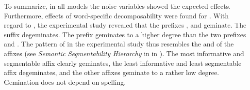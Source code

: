 To summarize, in all models the noise variables showed the expected effects. Furthermore, effects of {word-specific decomposability} were found for . 
With regard to , the experimental study revealed that the prefixes ,  and  geminate. The suffix  degeminates. 
The prefix  geminates to a higher degree than the two prefixes and . The pattern of  in the experimental study thus resembles the  and  of the affixes (see \textit{Semantic Segmentability Hierarchy} in  in ). The most informative and segmentable affix  clearly geminates, the least informative and least segmentable affix  degeminates, and the other affixes geminate to a rather low degree. Gemination does not depend on spelling. 


